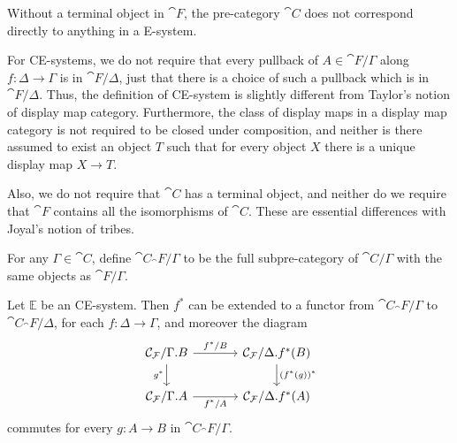 \begin{rmk}
Without a terminal object in $\cat{F}$, the pre-category $\cat{C}$ does not correspond
directly to anything in a E-system.
\end{rmk}

\begin{rmk}
For CE-systems, we do not require that every pullback of $A\in\cat{F}/\Gamma$ along $f:\Delta\to\Gamma$
is in $\cat{F}/\Delta$, just that there is a choice of such a pullback which is
in $\cat{F}/\Delta$. Thus, the definition of CE-system is slightly different from
Taylor's notion of display map category. Furthermore, the class of display maps in
a display map category is not required to be closed under composition, and neither
is there assumed to exist an object $T$ such that for every object $X$ there is a 
unique display map $X\to T$.
\end{rmk}

\begin{rmk}
Also, we do not require that $\cat{C}$ has a terminal object, and neither do
we require that $\cat{F}$ contains all the isomorphisms of $\cat{C}$. These are
essential differences with Joyal's notion of tribes.   
\end{rmk}

\begin{defn}
For any $\Gamma\in\cat{C}$, define $\cat{C}_\cat{F}/\Gamma$ to be the full
subpre-category of $\cat{C}/\Gamma$ with the same objects as $\cat{F}/\Gamma$. 
\end{defn}

\begin{lem}\label{lem:pb_selfdistributive}
Let $\mathbb{E}$ be an CE-system. Then $f^\ast$ can be extended to a functor from
$\cat{C}_\cat{F}/\Gamma$ to $\cat{C}_\cat{F}/\Delta$, for each $f:\Delta\to\Gamma$, and moreover the diagram
\begin{equation*}
\begin{tikzcd}[column sep=large]
\cat{C}_\cat{F}/\ctxext{\Gamma}{B} \arrow[r,"{f^\ast/B}"] \arrow[d,swap,"{g^\ast}"]
& \cat{C}_\cat{F}/\ctxext{\Delta}{f^\ast(B)} \arrow[d,"{(f^\ast(g))^\ast}"] \\
\cat{C}_\cat{F}/\ctxext{\Gamma}{A} \arrow[r,swap,"{f^\ast/A}"]
& \cat{C}_\cat{F}/\ctxext{\Delta}{f^\ast(A)}
\end{tikzcd}
\end{equation*}
commutes for every $g:A\to B$ in $\cat{C}_\cat{F}/\Gamma$.
\end{lem}


